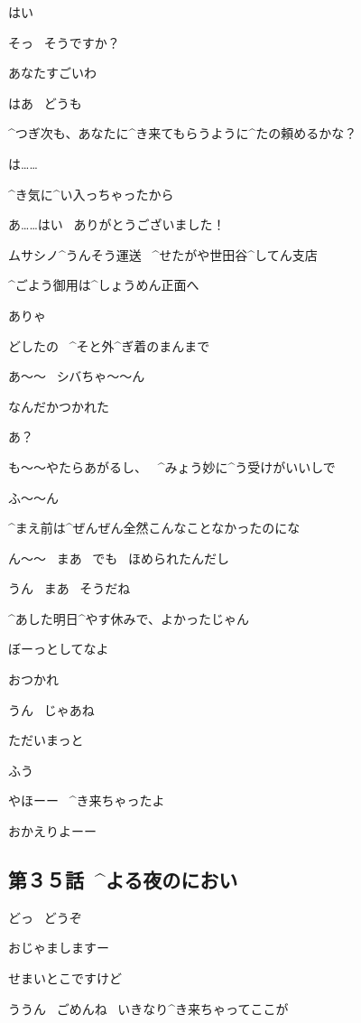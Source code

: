 \Maruko はい

\Kokone そっ
\ そうですか？

\Maruko あなたすごいわ

\Kokone はあ
\ どうも

\page
\Maruko ^{つぎ}{次}も、あなたに^{き}{来}てもらうように^{たの}{頼}めるかな？

\Kokone は……

\Maruko ^{き}{気}に^{い}{入}っちゃったから

\Kokone あ……はい
\ ありがとうございました！

\page[37]
\Sign ムサシノ^{うんそう}{運送}
\ ^{せたがや}{世田谷}^{してん}{支店}

\Sign ^{ごよう}{御用}は^{しょうめん}{正面}へ

\Shiba ありゃ

\Shiba どしたの
\ ^{そと}{外}^{ぎ}{着}のまんまで

\Kokone あ〜〜
\ シバちゃ〜〜ん

\Kokone なんだかつかれた

\Shiba あ？

\page
\Kokone も〜〜やたらあがるし、
\ ^{みょう}{妙}に^{う}{受}けがいいしで

\Shiba ふ〜〜ん

\Kokone ^{まえ}{前}は^{ぜんぜん}{全然}こんなことなかったのにな

\Shiba ん〜〜
\ まあ
\ でも
\ ほめられたんだし

\Kokone うん
\ まあ
\ そうだね

\Shiba ^{あした}{明日}^{やす}{休}みで、よかったじゃん

\Shiba ぼーっとしてなよ

\Shiba おつかれ

\Kokone うん
\ じゃあね

\page
\Kokone ただいまっと

\Kokone ふう

\page
\Alpha やほーー
\ ^{き}{来}ちゃったよ

\Person おかえりよーー


\subsection{第３５話\ ^{よる}{夜}のにおい}

\page[42]
\Kokone どっ
\ どうぞ

\Alpha おじゃましますー

\page
\Kokone せまいとこですけど

\Alpha ううん
\ ごめんね
\ いきなり^{き}{来}ちゃってここが

